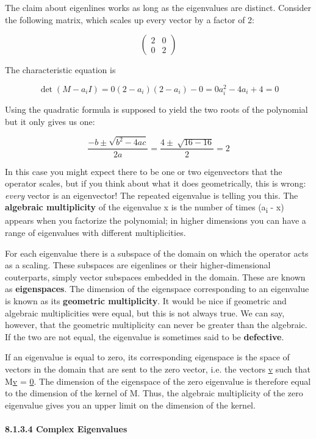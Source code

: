 \documentclass[oneside,english]{amsbook}
\numberwithin{section}{chapter}
\theoremstyle{plain}
\theoremstyle{definition}
\begin{document}
The claim about eigenlines works as long as the eigenvalues are
distinct. Consider the following matrix, which scales up every vector by
a factor of 2:

\[\begin{pmatrix}
	2 & 0 \\
	0 & 2
\end{pmatrix}\]

The characteristic equation is

\[{\det\left( M - a_{i}I \right) = 0
}{\left( 2 - a_{i} \right)\left( 2 - a_{i} \right) - 0 = 0
}{a_{i}^{2} - 4a_{i} + 4 = 0}\]

Using the quadratic formula is supposed to yield the two roots of the
polynomial but it only gives us one:

\[\frac{- b \pm \sqrt{b^{2} - 4ac}}{2a} = \frac{4 \pm \ \sqrt{16 - 16}}{2} = 2\]

In this case you might expect there to be one or two eigenvectors that
the operator scales, but if you think about what it does geometrically,
this is wrong: \emph{every} vector is an eigenvector! The repeated
eigenvalue is telling you this. The \textbf{algebraic multiplicity} of
the eigenvalue x is the number of times (a\textsubscript{i} - x) appears
when you factorize the polynomial; in higher dimensions you can have a
range of eigenvalues with different multiplicities.

For each eigenvalue there is a subspace of the domain on which the
operator acts as a scaling. These subspaces are eigenlines or their
higher-dimensional couterparts, simply vector subspaces embedded in the
domain. These are known as \textbf{eigenspaces}. The dimension of the
eigenspace corresponding to an eigenvalue is known as its
\textbf{geometric multiplicity}. It would be nice if geometric and
algebraic multiplicities were equal, but this is not always true. We can
say, however, that the geometric multiplicity can never be greater than
the algebraic. If the two are not equal, the eigenvalue is sometimes
said to be \textbf{defective}.

If an eigenvalue is equal to zero, its corresponding eigenspace is the
space of vectors in the domain that are sent to the zero vector, i.e.
the vectors \ul{v} such that M\ul{v} = \ul{0}. The dimension of the
eigenspace of the zero eigenvalue is therefore equal to the dimension of
the kernel of M. Thus, the algebraic multiplicity of the zero eigenvalue
gives you an upper limit on the dimension of the kernel.

\paragraph{8.1.3.4 Complex Eigenvalues}\label{complex-eigenvalues}
\end{document}
